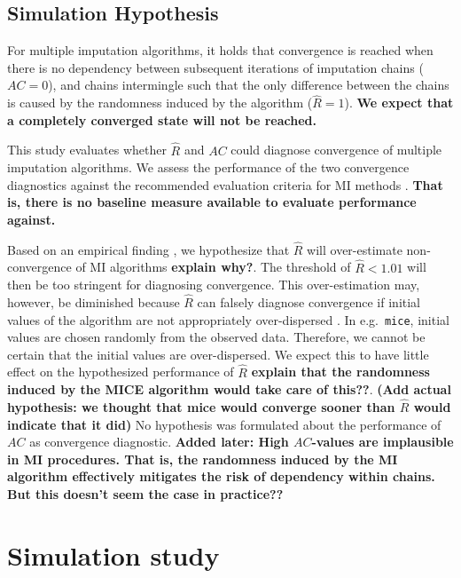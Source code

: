 \documentclass[Royal,times,sageh]{sagej}
\begin{document}
\hypertarget{simulation-hypothesis}{%
\subsection{Simulation Hypothesis}\label{simulation-hypothesis}}

For multiple imputation algorithms, it holds that convergence is reached
when there is no dependency between subsequent iterations of imputation
chains (\(AC = 0\)), and chains intermingle such that the only
difference between the chains is caused by the randomness induced by the
algorithm (\(\widehat{R} = 1\)). \textbf{We expect that a completely
converged state will not be reached.}

This study evaluates whether \(\widehat{R}\) and \(AC\) could diagnose
convergence of multiple imputation algorithms. We assess the performance
of the two convergence diagnostics against the recommended evaluation
criteria for MI methods \citep[i.e., average bias, average confidence
interval width, and empirical coverage rate across simulations;][\(\S\)
2.5.2]{buur18}. \textbf{That is, there is no baseline measure available
to evaluate performance against.}

Based on an empirical finding \citep{lace07}, we hypothesize that
\(\widehat{R}\) will over-estimate non-convergence of MI algorithms
\textbf{explain why?}. The threshold of \(\widehat{R} < 1.01\) will then
be too stringent for diagnosing convergence. This over-estimation may,
however, be diminished because \(\widehat{R}\) can falsely diagnose
convergence if initial values of the algorithm are not appropriately
over-dispersed \citep[p.~437]{broo98}. In e.g.~\texttt{mice}, initial
values are chosen randomly from the observed data. Therefore, we cannot
be certain that the initial values are over-dispersed. We expect this to
have little effect on the hypothesized performance of \(\widehat{R}\)
\textbf{explain that the randomness induced by the MICE algorithm would
take care of this??}. \textbf{(Add actual hypothesis: we thought that
mice would converge sooner than \(\widehat{R}\) would indicate that it
did)} No hypothesis was formulated about the performance of \(AC\) as
convergence diagnostic. \textbf{Added later: High \(AC\)-values are
implausible in MI procedures. That is, the randomness induced by the MI
algorithm effectively mitigates the risk of dependency within chains.
But this doesn't seem the case in practice??}

\hypertarget{simulation-study}{%
\section{Simulation study}\label{simulation-study}}
\end{document}

